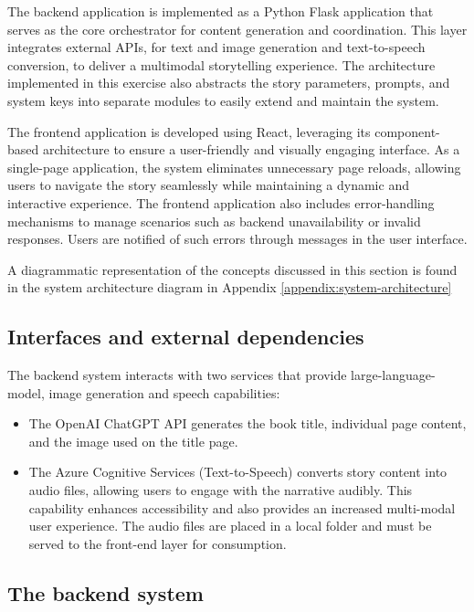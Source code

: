 \documentclass[conference]{IEEEtran}
\begin{document}
	The backend application is implemented as a Python Flask application that serves as the core orchestrator for content generation and coordination. This layer integrates external APIs, for text and image generation and text-to-speech conversion, to deliver a multimodal storytelling experience. The architecture implemented in this exercise also abstracts the story parameters, prompts, and system keys into separate modules to easily extend and maintain the system.
	
	The frontend application is developed using React, leveraging its component-based architecture to ensure a user-friendly and visually engaging interface. As a single-page application, the system eliminates unnecessary page reloads, allowing users to navigate the story seamlessly while maintaining a dynamic and interactive experience. The frontend application also includes error-handling mechanisms to manage scenarios such as backend unavailability or invalid responses. Users are notified of such errors through messages in the user interface.
	
	A diagrammatic representation of the concepts discussed in this section is found in the system architecture diagram in Appendix \ref{appendix:system-architecture}
	
	\subsection{Interfaces and external dependencies}
	
	The backend system interacts with two services that provide large-language-model, image generation and speech capabilities:
	
	\begin{itemize}
		\item The OpenAI ChatGPT API generates the book title, individual page content, and the image used on the title page.
		\item The Azure Cognitive Services (Text-to-Speech) converts story content into audio files, allowing users to engage with the narrative audibly. This capability enhances accessibility and also provides an increased multi-modal user experience. The audio files are placed in a local folder and must be served to the front-end layer for consumption.
	\end{itemize}
	
	\subsection{The backend system}
	
\end{document}
